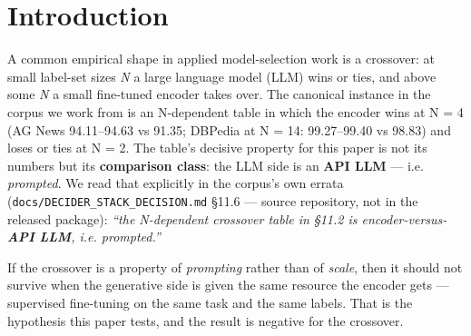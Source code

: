 \documentclass[11pt,a4paper]{article}
\begin{document}
\begin{abstract}
\textbf{Correction carried.} Fixing three defects lowered the \textbf{SetFit-MPNet} arm monotonically (\textbf{0.3158 $\to$ 0.2947 $\to$ 0.2632}), but the same order-probe fix \emph{raised} the \textbf{ModernBERT-base} arm (\textbf{0.342105 $\to$ 0.347368}). The universal claim ``every correction moved the affected arm down'' is false; the SetFit arm returned the opposite direction from the ModernBERT arm, which is the control on that claim.

\textbf{Not in this paper.} We make \textbf{no latency claim}: the encoder heads were timed locally in one forward batch while the 4B figures come from a served stack's stored rows, so the tree cannot support a fair latency comparison (see \S6.1). We also do \textbf{not} report $\kappa$ = 0.9014 (first blind reader) or $\kappa$ = 0.8577 (second, independent blind reader) --- nor their mutual $\kappa$ = 0.9125 --- as inter-annotator agreement: both labellers were \textbf{models}, so this is machine reproducibility of the fixture, not human agreement. The second reader \textbf{partially} replicates the first: the $\kappa$ magnitude holds (both $\ge$ 0.85) but the exact 0.90 headline does not. An independent human labeller is still owed (\S6.2).

\end{abstract}
\section{Introduction}

A common empirical shape in applied model-selection work is a crossover: at small label-set sizes \emph{N} a large language model (LLM) wins or ties, and above some \emph{N} a small fine-tuned encoder takes over. The canonical instance in the corpus we work from is an N-dependent table in which the encoder wins at N = 4 (AG News 94.11--94.63 vs 91.35; DBPedia at N = 14: 99.27--99.40 vs 98.83) and loses or ties at N = 2. The table's decisive property for this paper is not its numbers but its \textbf{comparison class}: the LLM side is an \textbf{API LLM} --- i.e. \emph{prompted}. We read that explicitly in the corpus's own errata (\texttt{docs/DECIDER\_STACK\_DECISION.md} \S11.6\cite{source_decider_stack_2026} --- source repository, not in the released package): \emph{``the N-dependent crossover table in \S11.2 is encoder-versus-\textbf{API LLM}, i.e. prompted.''}

If the crossover is a property of \emph{prompting} rather than of \emph{scale}, then it should not survive when the generative side is given the same resource the encoder gets --- supervised fine-tuning on the same task and the same labels. That is the hypothesis this paper tests, and the result is negative for the crossover.
\end{document}
